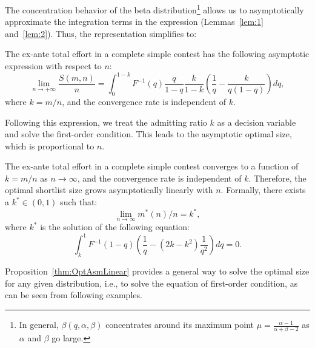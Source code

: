 The concentration behavior of the beta distribution\footnote{In general, $\beta(q,\alpha,\beta)$ concentrates around its maximum point $\mu=\frac{\alpha-1}{\alpha+\beta-2}$ as $\alpha$ and $\beta$ go large.} allows us to asymptotically approximate the integration terms in the expression (Lemmas~\ref{lem:1} and~\ref{lem:2}). Thus, the representation simplifies to:
\begin{lemma}\label{lem:AsyRep}
    The ex-ante total effort in a complete simple contest has the following asymptotic expression with respect to $n$:
    $$\lim_{n\rightarrow +\infty}\frac{S(m,n)}{n}=\int_0^{1-k}F^{-1}(q)\frac{q}{1-q}\frac{k}{1-k}(\frac{1}{q}-\frac{k}{q(1-q)})dq,$$
    where $k=m/n$, and the convergence rate is independent of $k$. 
\end{lemma}

Following this expression, we treat the admitting ratio $k$ as a decision variable and solve the first-order condition. This leads to the asymptotic optimal size, which is proportional to $n$.

\begin{proposition}\label{thm:OptAsmLinear}
The ex-ante total effort in a complete simple contest converges to a function of $k=m/n$ as $n \rightarrow \infty$, and the convergence rate is independent of 
$k$. Therefore, the optimal shortlist size grows asymptotically linearly with $n$. Formally, there exists a $k^*\in(0,1)$ such that:
$$\lim_{n\rightarrow \infty}m^*(n)/n=k^*,$$
where $k^*$ is the solution of the following equation:
\[
\int_k^1 F^{-1}(1-q)(\frac{1}{q}-(2k-k^2)\frac{1}{q^2})dq=0.
\]
\end{proposition}

Proposition~\ref{thm:OptAsmLinear} provides a general way to solve the optimal size for any given distribution, i.e., to solve the equation of first-order condition, as can be seen from following examples. 

